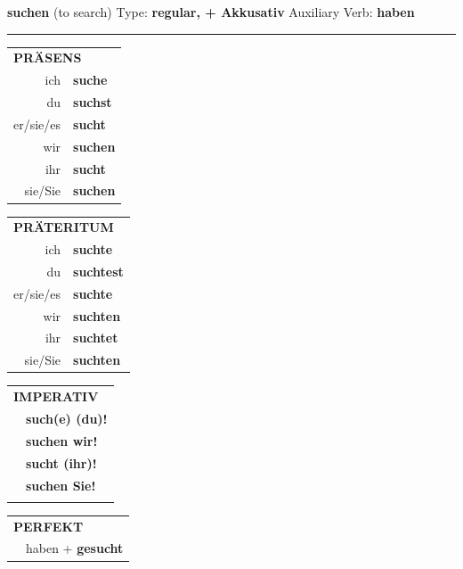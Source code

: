\documentclass[10pt,a4paper]{revtex4-2}
\begin{document}
\begin{verbbox-acc}
    {\Large \bf suchen} (to search) \hfill Type: \textbf{regular, + Akkusativ} \hfill Auxiliary Verb: \textbf{haben} 
    
     \vspace{5pt}

    \hrule
    
    \vspace{5pt}

  \begin{tabular}{rl}
     \multicolumn{2}{l}{\textbf{PRÄSENS} }\\
    ich & \textbf{suche}\\
    du & \textbf{suchst}\\
    er/sie/es & \textbf{sucht}\\
    wir & \textbf{suchen}\\
    ihr & \textbf{sucht}\\
    sie/Sie & \textbf{suchen}\\
  \end{tabular}
  \hfill
     \begin{tabular}{rl}
    \multicolumn{2}{l}{\textbf{PRÄTERITUM} }\\
    ich & \textbf{suchte}\\
    du & \textbf{suchtest}\\
    er/sie/es & \textbf{suchte}\\
    wir & \textbf{suchten}\\
    ihr & \textbf{suchtet}\\
    sie/Sie & \textbf{suchten}\\
  \end{tabular}
  \hfill
  \begin{tabular}{rl}
     \multicolumn{2}{l}{\textbf{IMPERATIV} }\\
   & \textbf{such(e) (du)!}\\
   & \textbf{suchen wir!}\\
   & \textbf{sucht (ihr)!}\\
   & \textbf{suchen Sie!}\\
   & \vspace{10pt}
  \end{tabular}

    \vspace{10pt}

 \begin{tabular}{rl}
     \multicolumn{2}{l}{\textbf{PERFEKT}}\\
   & haben + \textbf{gesucht}\\
  \end{tabular}
\hfill
   \begin{tabular}{rl}
   

\end{tabular}
\end{verbbox-acc}
\end{document}
